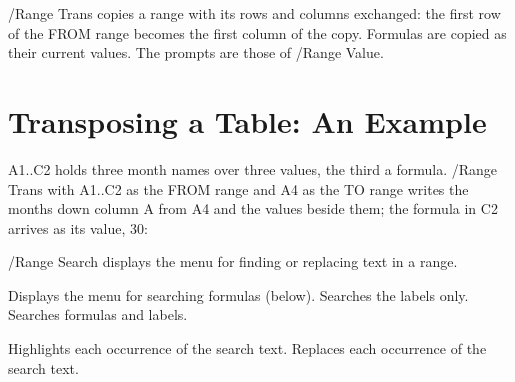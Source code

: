 
/Range Trans copies a range with its rows and columns exchanged: the first
row of the FROM range becomes the first column of the copy.  Formulas are
copied as their current values.  The prompts are those of /Range Value.

\section{Transposing a Table: An Example}
A1..C2 holds three month names over three values, the third a formula.
/Range Trans with A1..C2 as the FROM range and A4 as the TO range writes
the months down column A from A4 and the values beside them; the formula
in C2 arrives as its value, 30:


/Range Search displays the menu for finding or replacing text in a range.
\begin{Options}
 Displays the menu for searching formulas (below).
 Searches the labels only.
 Searches formulas and labels.
\end{Options}
\begin{Options}
 Highlights each occurrence of the search
  text.
 Replaces each occurrence of the search
  text.
\end{Options}
